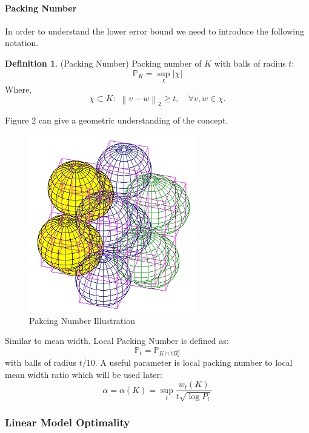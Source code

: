 \documentclass{amsart}
\theoremstyle{definition}
\newtheorem{definition}[theorem]{Definition}
\theoremstyle{remark}
\numberwithin{equation}{section}
\newcommand\norm[1]{\left\lVert#1\right\rVert}
\newcommand{\blankbox}[2]{%
  \parbox{\columnwidth}{\centering
    \setlength{\fboxsep}{0pt}%
    \fbox{\raisebox{0pt}[#2]{\hspace{#1}}}%
  }%
}
\begin{document}
\paragraph{Packing Number} In order to understand the lower error bound we need to introduce the following notation.
\begin{definition}(Packing Number)
Packing number of $K$ with balls of radius $t$:
\[
\mathbb{P}_K = \sup_{\chi} \vert \chi \vert
\]
Where,
\[
\chi \subset K: \,\, \norm{v-w}_2 \geq t,\quad \forall v,w\in \chi.
\]
\end{definition}
Figure 2 can give a geometric understanding of the concept.
\begin{figure}[tb]
\includegraphics{packing.jpg}
\caption{Pakcing Number Illustration}
\label{firstfig}
\end{figure}

Similar to mean width, Local Packing Number is defined as:
\[
\mathbb{P}_t = \mathbb{P}_{K\cap tB_2^n}
\]
with balls of radius $t/10$. A useful parameter is local packing number to local mean width ratio which will be used later:
\[
\alpha = \alpha(K) = \sup_t \frac{w_t(K)}{t\sqrt{\log P_t}}
\]
\subsubsection{\textbf{Linear Model Optimality}}
\end{document}

